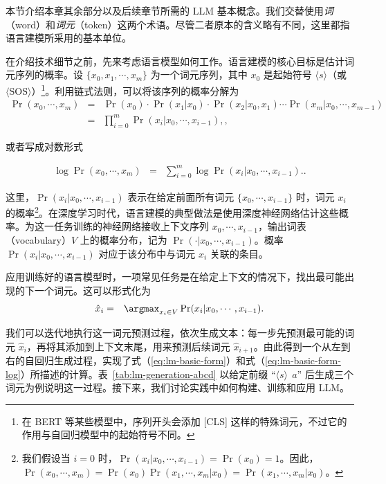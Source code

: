 本节介绍本章其余部分以及后续章节所需的 LLM 基本概念。我们交替使用\textit{词}（word）和\textit{词元}（token）这两个术语。尽管二者原本的含义略有不同，这里都指语言建模所采用的基本单位。

在介绍技术细节之前，先来考虑语言模型如何工作。语言建模的核心目标是估计词元序列的概率。设 $\{x_0, x_1, \cdots, x_m\}$ 为一个词元序列，其中 $x_0$ 是起始符号 $\langle s \rangle$（或 $\langle \mathrm{SOS} \rangle$）\footnote{在 BERT 等某些模型中，序列开头会添加 [CLS] 这样的特殊词元，不过它的作用与自回归模型中的起始符号不同。}。利用链式法则，可以将该序列的概率分解为
\begin{eqnarray}
\Pr(x_0,\cdots,x_m) & = & \Pr(x_0) \cdot \Pr(x_1|x_0) \cdot \Pr(x_2|x_0,x_1) \cdots \Pr(x_m|x_0,\cdots,x_{m-1}) \nonumber \\
                 & = & \prod_{i=0}^{m} \Pr(x_{i}|x_0,\cdots,x_{i-1}), \label{eq:lm-basic-form},
\end{eqnarray}

\noindent 或者写成对数形式

\begin{eqnarray}
\log \Pr(x_0,\cdots,x_m) & = & \sum_{i=0}^{m} \log \Pr(x_{i}|x_0,\cdots,x_{i-1}). \label{eq:lm-basic-form-log}.
\end{eqnarray}

\noindent 这里，$\Pr(x_{i}|x_0,\cdots,x_{i-1})$ 表示在给定前面所有词元 $\{x_0,\cdots,\allowbreak x_{i-1}\}$ 时，词元 $x_i$ 的概率\footnote{我们假设当 $i=0$ 时，$\Pr(x_{i}|x_0,\cdots,x_{i-1})=\Pr(x_0)=1$。因此，$\Pr(x_0,\cdots,x_m) = \Pr(x_0)\Pr(x_1,\cdots,x_m|x_0)=\Pr(x_1,\cdots,x_m|x_0)$。}。在深度学习时代，语言建模的典型做法是使用深度神经网络估计这些概率。为这一任务训练的神经网络接收上下文序列 $x_0,\cdots,x_{i-1}$，输出词表（vocabulary）$V$ 上的概率分布，记为 $\Pr(\cdot|x_0,\cdots,x_{i-1})$。概率 $\Pr(x_{i}|x_0,\cdots,x_{i-1})$ 对应于该分布中与词元 $x_i$ 关联的条目。

应用训练好的语言模型时，一项常见任务是在给定上下文的情况下，找出最可能出现的下一个词元。这可以形式化为
\begin{eqnarray}
\hat{x}_i & = & \argmax_{x_i \in V} \Pr(x_{i}|x_0,\cdots,x_{i-1}).
\end{eqnarray}

我们可以迭代地执行这一词元预测过程，依次生成文本：每一步先预测最可能的词元 $\hat{x}_i$，再将其添加到上下文末尾，用来预测后续词元 $\hat{x}_{i+1}$。由此得到一个从左到右的自回归生成过程，实现了式（\ref{eq:lm-basic-form}）和式（\ref{eq:lm-basic-form-log}）所描述的计算。表~\ref{tab:lm-generation-abcd} 以给定前缀 ``$\langle s \rangle\ \ a$'' 后生成三个词元为例说明这一过程。接下来，我们讨论实践中如何构建、训练和应用 LLM。

